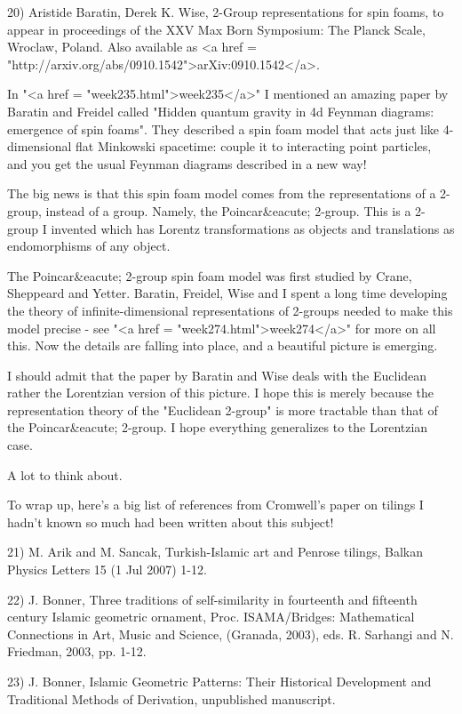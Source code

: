 20) Aristide Baratin, Derek K. Wise, 2-Group representations for spin 
foams, to appear in proceedings of the XXV Max Born Symposium: 
The Planck Scale, Wroclaw, Poland.  Also available as 
<a href = "http://arxiv.org/abs/0910.1542">arXiv:0910.1542</a>.

In "<a href = "week235.html">week235</a>" I mentioned an
amazing paper by Baratin and Freidel called "Hidden quantum
gravity in 4d Feynman diagrams: emergence of spin foams".  They
described a spin foam model that acts just like 4-dimensional flat
Minkowski spacetime: couple it to interacting point particles, and you
get the usual Feynman diagrams described in a new way!

The big news is that this spin foam model comes from the
representations of a 2-group, instead of a group.  Namely, the 
Poincar&eacute; 2-group.  This is a 2-group I invented which has Lorentz
transformations as objects and translations as endomorphisms of any
object.   

The Poincar&eacute; 2-group spin foam model was first studied by Crane,
Sheppeard and Yetter.  Baratin, Freidel, Wise and I spent a long time
developing the theory of infinite-dimensional representations of
2-groups needed to make this model precise - see "<a href =
"week274.html">week274</a>" for more on all this.  Now the details are
falling into place, and a beautiful picture is emerging.

I should admit that the paper by Baratin and Wise deals with the
Euclidean rather the Lorentzian version of this picture.  I hope this
is merely because the representation theory of the "Euclidean
2-group" is more tractable than that of the Poincar&eacute; 2-group.  I
hope everything generalizes to the Lorentzian case.

A lot to think about.

To wrap up, here's a big list of references from Cromwell's paper on
tilings I hadn't known so much had been written about this subject!

21) M. Arik and M. Sancak, Turkish-Islamic art and Penrose 
tilings, Balkan Physics Letters 15 (1 Jul 2007) 1-12.
 
22) J. Bonner, Three traditions of self-similarity in fourteenth 
and fifteenth century Islamic geometric ornament, Proc. 
ISAMA/Bridges: Mathematical Connections in Art, Music and Science, 
(Granada, 2003), eds. R. Sarhangi and N. Friedman, 2003, pp. 1-12.

23) J. Bonner, Islamic Geometric Patterns: Their Historical Development 
and Traditional Methods of Derivation, unpublished manuscript.
 
